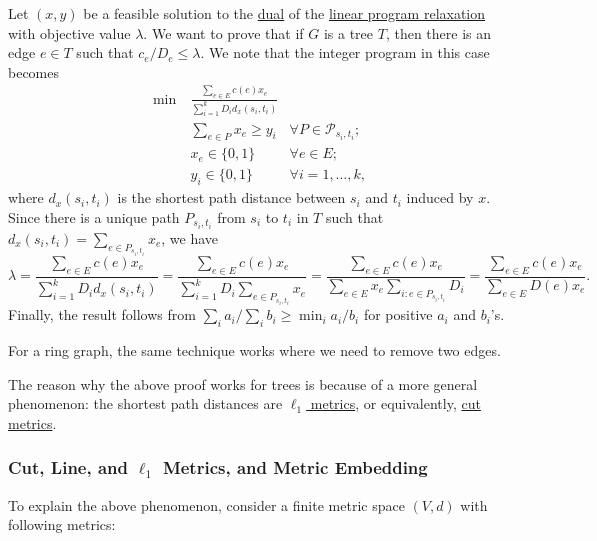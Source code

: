 \begin{explanation}
	Let \((x, y)\) be a feasible solution to the \hyperref[eq:non-uniform-sparsest-cut-LP-dual]{dual} of the \hyperref[eq:non-uniform-sparsest-cut-LP-primal]{linear program relaxation} with objective value \(\lambda \). We want to prove that if \(G\) is a tree \(T\), then there is an edge \(e \in T\) such that \(c_e / D_e \leq \lambda \). We note that the integer program in this case becomes
	\[
		\begin{aligned}
			\min~ & \frac{\sum_{e \in E} c(e) x_e}{\sum_{i=1}^{k} D_i d_x(s_i, t_i)}                                           \\
			      & \sum_{e \in P} x_e \geq y_i                                      & \forall P \in \mathcal{P} _{s_i, t_i} ; \\
			      & x_e \in \{ 0, 1 \}                                               & \forall e \in E ;                       \\
			      & y_i \in \{ 0, 1 \}                                               & \forall i = 1, \dots , k,
		\end{aligned}
	\]
	where \(d_x(s_i, t_i)\) is the shortest path distance between \(s_i\) and \(t_i\) induced by \(x\). Since there is a unique path \(P_{s_i, t_i}\) from \(s_i\) to \(t_i\) in \(T\) such that \(d_x(s_i, t_i) = \sum_{e \in P_{s_i, t_i}} x_e\), we have
	\[
		\lambda
		= \frac{\sum_{e \in E} c(e) x_e}{\sum_{i=1}^{k} D_i d_x(s_i, t_i)}
		= \frac{\sum_{e \in E} c(e) x_e}{\sum_{i=1}^{k} D_i \sum_{e \in P_{s_i, t_i}} x_e}
		= \frac{\sum_{e \in E} c(e) x_e}{\sum_{e \in E} x_e \sum_{i \colon e \in P_{s_i, t_i}} D_i}
		= \frac{\sum_{e \in E} c(e) x_e}{\sum_{e \in E} D(e) x_e }.
	\]
	Finally, the result follows from \(\sum_{i} a_i / \sum_{i} b_i \geq \min _i a_i / b_i\) for positive \(a_i\) and \(b_i\)'s.
\end{explanation}

\begin{eg}[Ring]
	For a ring graph, the same technique works where we need to remove two edges.
\end{eg}

The reason why the above proof works for trees is because of a more general phenomenon: the shortest path distances are \hyperref[def:l1-metric]{\(\ell _1\) metrics}, or equivalently, \hyperref[def:cut-metric]{cut metrics}.

\subsubsection{Cut, Line, and \(\ell _1\) Metrics, and Metric Embedding}
To explain the above phenomenon, consider a finite metric space \((V, d)\) with following metrics:

